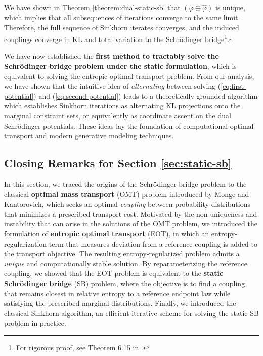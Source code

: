 \documentclass{article}
\begin{document}
We have shown in Theorem \ref{theorem:dual-static-sb} that $(\varphi\oplus \hat\varphi)$ is unique, which implies that all subsequences of iterations converge to the same limit. Therefore, the full sequence of Sinkhorn iterates converges, and the induced couplings converge in KL and total variation to the Schrödinger bridge\footnote{For rigorous proof, see Theorem 6.15 in \citet{nutz2021introduction}.}.\hfill $\square$

We have now established the \textbf{first method to tractably solve the Schrödinger bridge problem under the static formulation}, which is equivalent to solving the entropic optimal transport problem. From our analysis, we have shown that the intuitive idea of \textit{alternating} between solving (\ref{eq:first-potential}) and (\ref{eq:second-potential}) leads to a theoretically grounded algorithm which establishes Sinkhorn iterations as alternating KL projections onto the marginal constraint sets, or equivalently as coordinate ascent on the dual Schrödinger potentials. These ideas lay the foundation of computational optimal transport and modern generative modeling techniques.

\subsection{Closing Remarks for Section \ref{sec:static-sb}}
In this section, we traced the origins of the Schrödinger bridge problem to the classical \textbf{optimal mass transport} (OMT) problem introduced by Monge and Kantorovich, which seeks an optimal \textit{coupling} between probability distributions that minimizes a prescribed transport cost. Motivated by the non-uniqueness and instability that can arise in the solutions of the OMT problem, we introduced the formulation of \textbf{entropic optimal transport} (EOT), in which an entropy-regularization term that measures deviation from a reference coupling is added to the transport objective. The resulting entropy-regularized problem admits a \textit{unique} and computationally stable solution. By reparameterizing the reference coupling, we showed that the EOT problem is equivalent to the \textbf{static Schrödinger bridge} (SB) problem, where the objective is to find a coupling that remains closest in relative entropy to a reference endpoint law while satisfying the prescribed marginal distributions. Finally, we introduced the classical Sinkhorn algorithm, an efficient iterative scheme for solving the static SB problem in practice.
\end{document}
